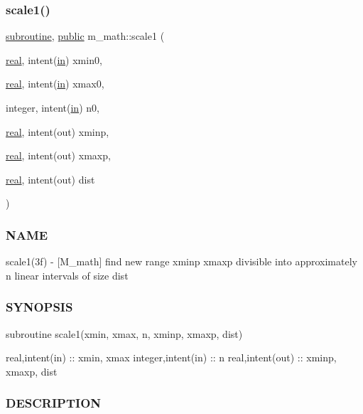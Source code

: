 \subsubsection{\texorpdfstring{scale1()}{scale1()}}
{\footnotesize\ttfamily \hyperlink{M__stopwatch_83_8txt_acfbcff50169d691ff02d4a123ed70482}{subroutine}, \hyperlink{M__stopwatch_83_8txt_a2f74811300c361e53b430611a7d1769f}{public} m\+\_\+math\+::scale1 (\begin{DoxyParamCaption}\item[{\hyperlink{read__watch_83_8txt_abdb62bde002f38ef75f810d3a905a823}{real}, intent(\hyperlink{M__journal_83_8txt_afce72651d1eed785a2132bee863b2f38}{in})}]{xmin0,  }\item[{\hyperlink{read__watch_83_8txt_abdb62bde002f38ef75f810d3a905a823}{real}, intent(\hyperlink{M__journal_83_8txt_afce72651d1eed785a2132bee863b2f38}{in})}]{xmax0,  }\item[{integer, intent(\hyperlink{M__journal_83_8txt_afce72651d1eed785a2132bee863b2f38}{in})}]{n0,  }\item[{\hyperlink{read__watch_83_8txt_abdb62bde002f38ef75f810d3a905a823}{real}, intent(out)}]{xminp,  }\item[{\hyperlink{read__watch_83_8txt_abdb62bde002f38ef75f810d3a905a823}{real}, intent(out)}]{xmaxp,  }\item[{\hyperlink{read__watch_83_8txt_abdb62bde002f38ef75f810d3a905a823}{real}, intent(out)}]{dist }\end{DoxyParamCaption})}



\subsubsection*{N\+A\+ME}

scale1(3f) -\/ \mbox{[}M\+\_\+math\mbox{]} find new range xminp xmaxp divisible into approximately n linear intervals of size dist 

\subsubsection*{S\+Y\+N\+O\+P\+S\+IS}

subroutine scale1(xmin, xmax, n, xminp, xmaxp, dist)

real,intent(in) \+:\+: xmin, xmax integer,intent(in) \+:\+: n real,intent(out) \+:\+: xminp, xmaxp, dist

\subsubsection*{D\+E\+S\+C\+R\+I\+P\+T\+I\+ON}

